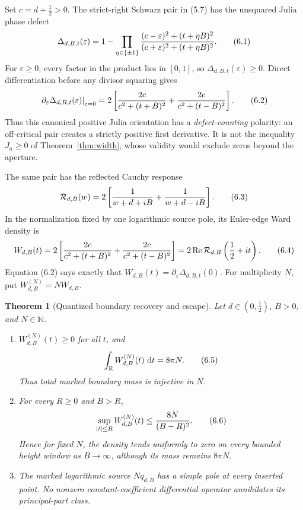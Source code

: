 \documentclass[11pt]{article}
\newtheorem{theorem}{Theorem}[section]
\theoremstyle{definition}
\theoremstyle{remark}
\newcommand{\R}{\mathbb R}
\newcommand{\N}{\mathbb N}
\newcommand{\dd}{\,\mathrm d}
\newcommand{\Rea}{\operatorname{Re}}
\newcommand{\eqtag}[1]{\qquad\text{\upshape(#1)}}
\begin{document}
Set \(c=d+\frac12>0\).  The strict-right Schwarz pair in (5.7) has
the unsquared Julia phase defect
\[
 \Delta_{d,B,t}(\varepsilon)
 =1-\prod_{\eta\in\{\pm1\}}
 \frac{(c-\varepsilon)^2+(t+\eta B)^2}
      {(c+\varepsilon)^2+(t+\eta B)^2}.              \eqtag{6.1}
\]
For \(\varepsilon\geq0\), every factor in the product lies in
\([0,1]\), so \(\Delta_{d,B,t}(\varepsilon)\geq0\).
Direct differentiation before any divisor squaring gives
\[
 \left.\partial_\varepsilon
   \Delta_{d,B,t}(\varepsilon)\right|_{\varepsilon=0}
 =2\left[
 \frac{2c}{c^2+(t+B)^2}
 +\frac{2c}{c^2+(t-B)^2}
 \right].                                           \eqtag{6.2}
\]
Thus this canonical positive Julia orientation has a
\emph{defect-counting} polarity: an off-critical pair creates a
strictly positive first derivative.  It is not the inequality
\(J_a\geq0\) of Theorem~\ref{thm:width}, whose validity would exclude
zeros beyond the aperture.

The same pair has
the reflected Cauchy response
\[
 \mathcal R_{d,B}(w)
 =2\left[
   \frac1{w+d+iB}+\frac1{w+d-iB}
 \right].                                           \eqtag{6.3}
\]
In the normalization fixed by one logarithmic source pole, its
Euler-edge Ward density is
\[
 W_{d,B}(t)
 =2\left[
  \frac{2c}{c^2+(t+B)^2}
 +\frac{2c}{c^2+(t-B)^2}
 \right]
 =2\Rea\mathcal R_{d,B}\left(\frac12+it\right).      \eqtag{6.4}
\]
Equation (6.2) says exactly that
\(W_{d,B}(t)=\partial_\varepsilon
\Delta_{d,B,t}(0)\).
For multiplicity \(N\), put \(W_{d,B}^{(N)}=NW_{d,B}\).

\begin{theorem}[Quantized boundary recovery and escape]
\label{thm:ward}
Let \(d\in(0,\frac12)\), \(B>0\), and \(N\in\N\).
\begin{enumerate}[label=\textup{(\roman*)}]
\item \(W_{d,B}^{(N)}(t)\geq0\) for all \(t\), and
      \[
        \int_{\R}W_{d,B}^{(N)}(t)\,\dd t=8\pi N.      \eqtag{6.5}
      \]
      Thus total marked boundary mass is injective in \(N\).
\item For every \(R\geq0\) and \(B>R\),
      \[
        \sup_{|t|\leq R}W_{d,B}^{(N)}(t)
        \leq \frac{8N}{(B-R)^2}.                     \eqtag{6.6}
      \]
      Hence for fixed \(N\), the density tends uniformly to zero on
      every bounded height window as \(B\to\infty\), although its mass
      remains \(8\pi N\).
\item The marked logarithmic source \(Nq_{d,B}\) has a simple pole at
      every inserted point.  No nonzero constant-coefficient
      differential operator annihilates its principal-part class.
\end{enumerate}
\end{theorem}
\end{document}
